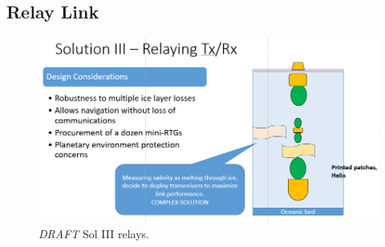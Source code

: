 \subsection{Relay Link}
\begin{figure}[htb]
	\centering
	\includegraphics[width=\textwidth]{figures/comms/iceLink-relay}
	\caption{ \textit{DRAFT} Sol III relays.}
	\label{fig:iceLink-relay}
\end{figure}